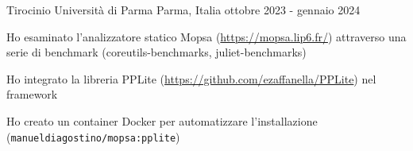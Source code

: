 

\begin{cventries}

  \cventry
    {Tirocinio} %
    {Università di Parma} %
    {Parma, Italia} %
    {ottobre 2023 - gennaio 2024} %
    {
      \begin{cvitems} %
				\item {Ho esaminato l'analizzatore statico Mopsa (\url{https://mopsa.lip6.fr/}) attraverso una serie di benchmark (coreutils-benchmarks, juliet-benchmarks)}
        \item {Ho integrato la libreria PPLite (\url{https://github.com/ezaffanella/PPLite}) nel framework}
        \item {Ho creato un container Docker per automatizzare l'installazione (\texttt{manueldiagostino/mopsa:pplite})}	
      \end{cvitems}
    }

\end{cventries}
